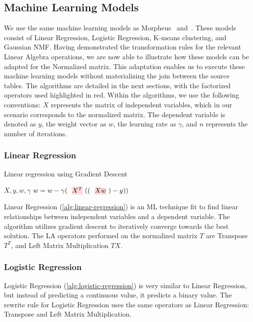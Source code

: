 \subsection{Machine Learning Models}
We use the same machine learning models as Morpheus~\cite{morpheus} and~\cite{amalur_tkde24}. These models consist of Linear Regression, Logistic Regression, K-means clustering, and Gaussian NMF. Having demonstrated the transformation rules for the relevant Linear Algebra operations, we are now able to illustrate how these models can be adapted for the Normalized matrix. This adaptation enables us to execute these machine learning models without materializing the join between the source tables. The algorithms are detailed in the next sections, with the factorized operators used highlighted in red. Within the algorithms, we use the following conventions: $X$ represents the matrix of independent variables, which in our scenario corresponds to the normalized matrix. The dependent variable is denoted as $y$, the weight vector as $w$, the learning rate as $\gamma$, and $n$ represents the number of iterations.

\subsubsection{Linear Regression}
\begin{algorithm}[ht!]
  \caption[Linear regression]{Linear regression using Gradient Descent
    ~\cite{morpheus}}\label{alg:linear-regression}
  \begin{algorithmic}
    \Require $X, y , w, \gamma$
    \State $w = w - \gamma (\text{\red{$X^T$}}((\text{\red{$X w$}}) - y))$
    \EndFor
  \end{algorithmic}
\end{algorithm}
Linear Regression (\autoref{alg:linear-regression}) is an ML technique fit to find linear relationships between independent variables and a dependent variable. The algorithm utilizes gradient descent to iteratively converge towards the best solution. The LA operators performed on the normalized matrix $T$ are Transpose $T^T$, and Left Matrix Multiplication $TX$.

\subsubsection{Logistic Regression}
Logistic Regression (\autoref{alg:logistic-regression}) is very similar to Linear Regression, but instead of predicting a continuous value, it predicts a binary value. The rewrite rule for Logistic Regression uses the same operators as Linear Regression: Transpose and Left Matrix Multiplication.

